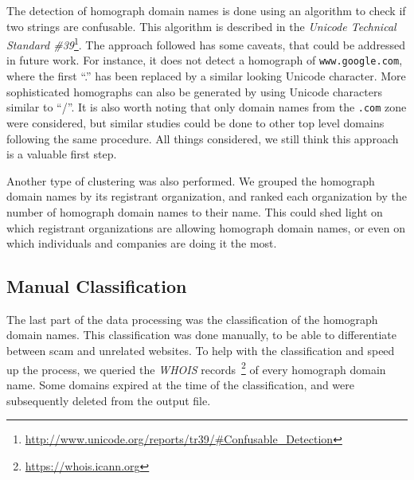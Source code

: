 \documentclass[letterpaper,twocolumn,10pt]{article}
\begin{document}
The detection of homograph domain names is done using an algorithm to check if two strings are confusable.
This algorithm is described in the \textit{Unicode Technical Standard \#39}\footnote{\url{http://www.unicode.org/reports/tr39/#Confusable_Detection}}.
The approach followed has some caveats, that could be addressed in future work.
For instance, it does not detect a homograph of \texttt{www.google.com}, where the first ``.'' has been replaced by a similar looking Unicode character.
More sophisticated homographs can also be generated by using Unicode characters similar to ``/''.
It is also worth noting that only domain names from the \texttt{.com} zone were considered, but similar studies could be done to other top level domains following the same procedure.
All things considered, we still think this approach is a valuable first step.

Another type of clustering was also performed.
We grouped the homograph domain names by its registrant organization, and ranked each organization by the number of homograph domain names to their name.
This could shed light on which registrant organizations are allowing homograph domain names, or even on which individuals and companies are doing it the most.

\subsection{Manual Classification}
The last part of the data processing was the classification of the homograph domain names.
This classification was done manually, to be able to differentiate between scam and unrelated websites.
To help with the classification and speed up the process, we queried the \textit{WHOIS} records~\footnote{\url{https://whois.icann.org}} of every homograph domain name.
Some domains expired at the time of the classification, and were subsequently deleted from the output file.
\end{document}
